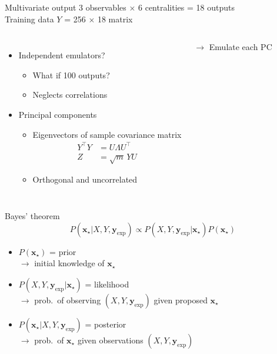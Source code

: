 \documentclass{beamer}
\newcommand{\tran}{^\intercal}
\newcommand{\x}{\mathbf x}
\newcommand{\y}{\mathbf y}
\newcommand{\xs}{\x_\star}
\newcommand{\yexp}{\y_\text{exp}}
\begin{document}
\begin{frame}{Multivariate output}
  3 observables $\times$ 6 centralities = 18 outputs \\
  Training data $Y$ = 256 $\times$ 18 matrix
  \smallskip
  \begin{columns}[c]
    \begin{itemize}
      \item Independent emulators?
        \begin{itemize}
          \item What if 100 outputs?
          \item Neglects correlations
        \end{itemize}
      \item Principal components
        \begin{itemize}
          \item Eigenvectors of sample covariance matrix
            \begin{align*}
              Y\tran Y &= U \Lambda U\tran \\
              Z &= \sqrt m \, YU
            \end{align*}
          \item Orthogonal and uncorrelated
        \end{itemize}
    \end{itemize}
    \centering
    $\rightarrow$ Emulate each PC
    \centering
  \end{columns}
\end{frame}


\begin{frame}{Bayes' theorem}
  \begin{equation*}
    P(\xs|X,Y,\yexp) \propto P(X,Y,\yexp|\xs) P(\xs)
  \end{equation*}
  \begin{itemize}
    \item $P(\xs)$ = prior \\
      $\rightarrow$ initial knowledge of $\xs$
    \item $P(X,Y,\yexp|\xs)$ = likelihood \\
      $\rightarrow$ prob.\ of observing $(X, Y, \yexp)$ given proposed $\xs$
      \color{theme!80!black}
    \item $P(\xs|X,Y,\yexp)$ = posterior \\
      $\rightarrow$ prob.\ of $\xs$ given observations $(X, Y, \yexp)$
  \end{itemize}
\end{frame}
\end{document}
